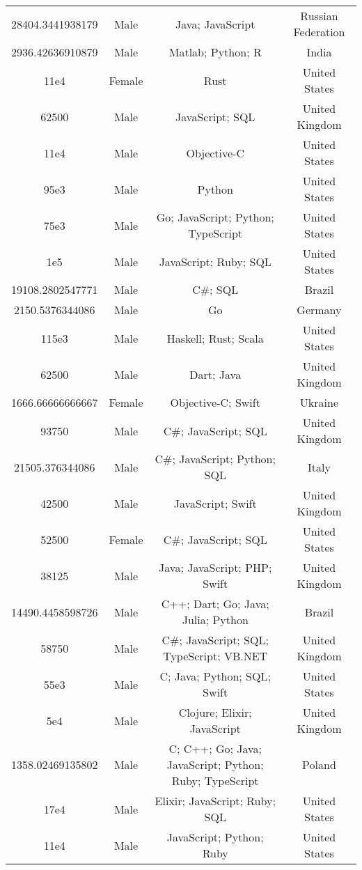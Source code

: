 \begin{center}
\begin{tabular}{ |c|c|c|c| }
28404.3441938179  &  Male  &  Java; JavaScript  &  Russian Federation  \\ 
2936.42636910879  &  Male  &  Matlab; Python; R  &  India  \\ 
11e4  &  Female  &  Rust  &  United States  \\ 
62500  &  Male  &  JavaScript; SQL  &  United Kingdom  \\ 
11e4  &  Male  &  Objective-C  &  United States  \\ 
95e3  &  Male  &  Python  &  United States  \\ 
75e3  &  Male  &  Go; JavaScript; Python; TypeScript  &  United States  \\ 
1e5  &  Male  &  JavaScript; Ruby; SQL  &  United States  \\ 
19108.2802547771  &  Male  &  C\#; SQL  &  Brazil  \\ 
2150.5376344086  &  Male  &  Go  &  Germany  \\ 
115e3  &  Male  &  Haskell; Rust; Scala  &  United States  \\ 
62500  &  Male  &  Dart; Java  &  United Kingdom  \\ 
1666.66666666667  &  Female  &  Objective-C; Swift  &  Ukraine  \\ 
93750  &  Male  &  C\#; JavaScript; SQL  &  United Kingdom  \\ 
21505.376344086  &  Male  &  C\#; JavaScript; Python; SQL  &  Italy  \\ 
42500  &  Male  &  JavaScript; Swift  &  United Kingdom  \\ 
52500  &  Female  &  C\#; JavaScript; SQL  &  United States  \\ 
38125  &  Male  &  Java; JavaScript; PHP; Swift  &  United Kingdom  \\ 
14490.4458598726  &  Male  &  C++; Dart; Go; Java; Julia; Python  &  Brazil  \\ 
58750  &  Male  &  C\#; JavaScript; SQL; TypeScript; VB.NET  &  United Kingdom  \\ 
55e3  &  Male  &  C; Java; Python; SQL; Swift  &  United States  \\ 
5e4  &  Male  &  Clojure; Elixir; JavaScript  &  United Kingdom  \\ 
1358.02469135802  &  Male  &  C; C++; Go; Java; JavaScript; Python; Ruby; TypeScript  &  Poland  \\ 
17e4  &  Male  &  Elixir; JavaScript; Ruby; SQL  &  United States  \\ 
11e4  &  Male  &  JavaScript; Python; Ruby  &  United States  \\ 

\end{tabular}
\end{center}
